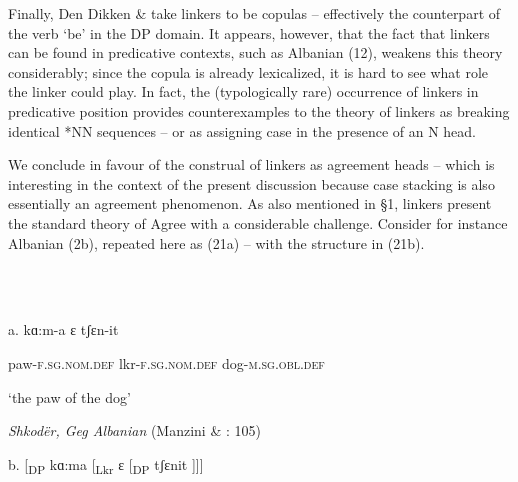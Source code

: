 \documentclass[output=paper]{langsci/langscibook}
\begin{document}
\begin{styleSfondomedioiColorexxi}
  Finally, Den Dikken \& \citet{Singhapreecha2004} take linkers to be copulas – effectively the counterpart of the verb ‘be’ in the DP domain. It appears, however, that the fact that linkers can be found in predicative contexts, such as Albanian (12), weakens this theory considerably; since the copula is already lexicalized, it is hard to see what role the linker could play. In fact, the (typologically rare) occurrence of linkers in predicative position provides counterexamples to the theory of linkers as breaking identical *NN sequences – or as assigning case in the presence of an N head. 
\end{styleSfondomedioiColorexxi}

\begin{styleSfondomedioiColorexxi}
  We conclude in favour of the construal of linkers as agreement heads – which is interesting in the context of the present discussion because case stacking is also essentially an agreement phenomenon. As also mentioned in §1, linkers present the standard theory of Agree with a considerable challenge. Consider for instance Albanian (2b), repeated here as (21a) – with the structure in (21b).
\end{styleSfondomedioiColorexxi}

\begin{styleparagrafo}
\ea%
    \label{ex:key:21}
    \gll\\
        \\
    \glt
    \z

          a.   kɑ:m-a      ɛ          tʃɛn-it          
\end{styleparagrafo}

\begin{styleparagrafo}
    paw-\textsc{f.sg.nom.def}   lkr-\textsc{f.sg.nom.def}  dog-\textsc{m.sg.obl.def} 
\end{styleparagrafo}

\begin{styleSfondomedioiColorexxi}
‘the paw of the dog’
\end{styleSfondomedioiColorexxi}

\begin{styleSfondomedioiColorexxi}
\textit{Shkodër, Geg Albanian} (Manzini \& \citealt{Savoia2011b}: 105)
\end{styleSfondomedioiColorexxi}

\begin{styleSfondomedioiColorexxi}
  b.  [\textsubscript{DP} kɑ:ma    [\textsubscript{Lkr} ɛ  [\textsubscript{DP} tʃɛnit ]]] 
\end{styleSfondomedioiColorexxi}
\end{document}
